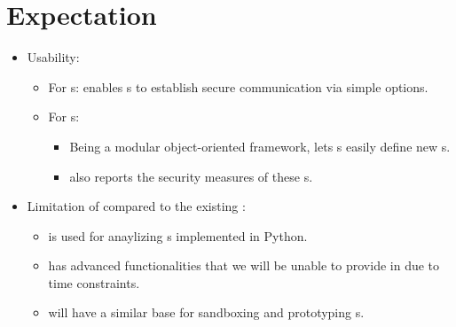 
\section{Expectation}

\begin{itemize}
\item Usability:
  \begin{itemize}
  \item For \eu s: \cry{} enables \eu s to establish
    secure communication via simple \cl{} options.
  \item For \cg s:
    \begin{itemize}
    \item Being a modular object-oriented framework,
      \cry{} lets \cg s easily define new \cs s.
    \item \cry{} also reports the security measures
      of these \cs s.
    \end{itemize}
\end{itemize}
\item Limitation of \cry{} compared to
  the existing \charm{} \cf:
  \begin{itemize}
  \item \charm{} is used for anaylizing \cs s
    implemented in Python.
  \item \charm{} has advanced functionalities
    that we will be unable to provide in \cry{}
    due to time constraints.
  \item \cry{} will have a similar base for sandboxing
    and prototyping \cs s.
  \end{itemize}
\end{itemize}

